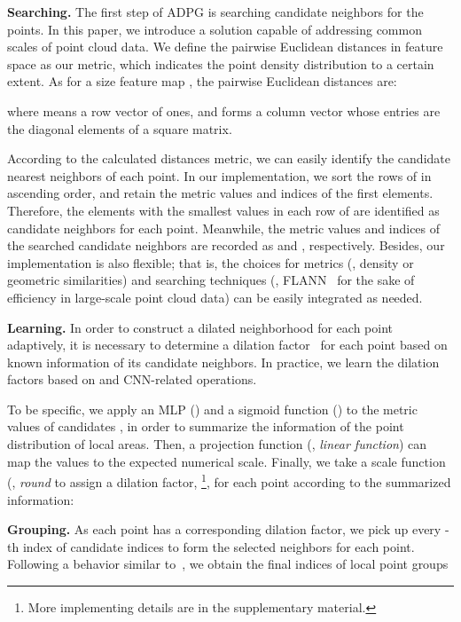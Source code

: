 \documentclass[10pt,twocolumn,letterpaper]{article}
\begin{document}
\noindent \textbf{Searching.} The first step of ADPG is searching candidate neighbors for the points. In this paper, we introduce a solution capable of addressing common scales of point cloud data. We define the pairwise Euclidean distances  in feature space as our metric, which indicates the point density distribution to a certain extent. As for a  size feature map , the pairwise Euclidean distances are:

where  means a  row vector of ones, and  forms a  column vector whose entries are the  diagonal elements of a  square matrix. 

According to the calculated distances metric, we can easily identify the  candidate nearest neighbors of each point. In our implementation, we sort the rows of  in ascending order, and retain the metric values and indices of the first  elements. Therefore, the elements with the smallest  values in each row of  are identified as candidate neighbors for each point. Meanwhile, the metric values and indices of the searched candidate neighbors are recorded as  and , respectively. Besides, our implementation is also flexible; that is, the choices for metrics (\eg, density or geometric similarities) and searching techniques (\eg, FLANN~\cite{muja2009fast} for the sake of efficiency in large-scale point cloud data) can be easily integrated as needed.

\noindent \textbf{Learning.} In order to construct a dilated neighborhood for each point adaptively, it is necessary to determine a dilation factor~\cite{yu2015multi} for each point based on known information of its candidate neighbors. In practice, we learn the dilation factors based on  and CNN-related operations.  

To be specific, we apply an MLP () and a sigmoid function () to the metric values of candidates , in order to summarize the information of the point distribution of local areas. Then, a projection function  (\eg, \emph{linear function}) can map the values to the expected numerical scale. Finally, we take a scale function  (\eg, \emph{round} to assign a dilation factor, \footnote{More implementing details are in the supplementary material.}, for each point according to the summarized information:


\noindent \textbf{Grouping.} As each point has a corresponding dilation factor, we pick up every -th index of candidate indices  to form the selected  neighbors for each point. Following a behavior similar to~\cite{engelmann2019dilated}, we obtain the final indices of local point groups 
\end{document}
